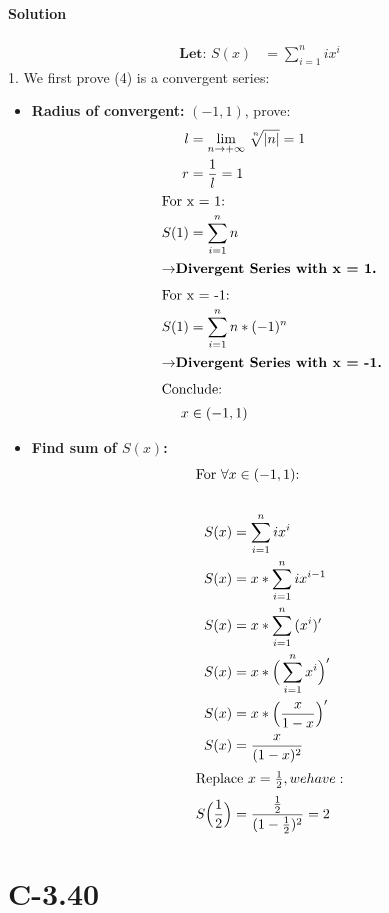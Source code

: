 \documentclass{article}
\begin{document}
  \paragraph{Solution}
    \begin{align}
      \textbf{Let: }S(x) &= \sum_{i=1}^{n}{i{x}^i}
    \end{align}
    1. We first prove (4) is a convergent series:\par
    \begin{itemize}
      \item {
        \textbf{Radius of convergent: } $(-1,1)$, prove: 
        \begin{align*}
          l &= \lim_{n\rightarrow+\infty}{\sqrt[\leftroot{-2}\uproot{2}n]{|n|}} = 1\\
          r &= \frac{1}{l} = 1 \\
          \intertext{For x = 1:}
          S(1) &= \sum_{i=1}^{n}n \\
          \intertext{$\rightarrow$\textbf{Divergent Series with x = 1.}}
          \intertext{For x = -1:}
          S(1) &= \sum_{i=1}^{n}{n*(-1)^n} \\
          \intertext{$\rightarrow$\textbf{Divergent Series with x = -1.}}
          \intertext{Conclude:}
          x&\in(-1,1)
        \end{align*}
      }
      \newpage
      \item {
        \textbf{Find sum of $S(x)$: }
        \begin{align*}
          \intertext{For $\forall x \in (-1,1)$:}\\
          S(x) &= \sum_{i=1}^{n}{i{x}^i} \\
          S(x) &= x * \sum_{i=1}^{n}{i{x}^{i-1}} \\
          S(x) &= x * \sum_{i=1}^{n}{({x}^{i})'} \\
          S(x) &= x * \Big(\sum_{i=1}^{n}{{x}^{i}}\Big)' \\
          S(x) &= x * \Big(\frac{x}{1-x}\Big)' \\
          S(x) &= \frac{x}{(1-x)^2} \\
        \intertext{Replace $x = \frac{1}{2}, we have:$ }
          S\Big(\frac{1}{2}\Big) &= \frac{\frac{1}{2}}{(1-\frac{1}{2})^2} =2
        \end{align*}
      }
    \end{itemize}
    \newpage
    
\section{C-3.40}
\end{document}
